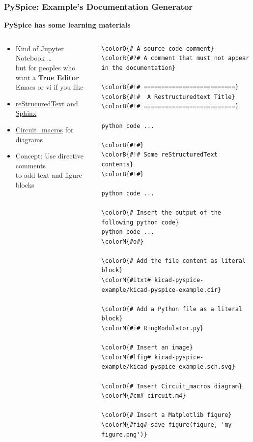 \begin{frame}[fragile]
  \frametitle{PySpice: Example's Documentation Generator}
  \centerline{\textbf{PySpice has some learning materials}}
  \begin{columns}[T]
    \begin{column}{.6\textwidth}
      \begin{itemize}
      \item Kind of Jupyter Notebook \ldots \\
        but for peoples who want a \textbf{True Editor} \\
        {\small Emacs} {\tiny or vi if you like}
      \item \href{http://docutils.sourceforge.net/rst.html}{reStrucuredText} and \href{http://www.sphinx-doc.org}{Sphinx}
      \item \href{https://ece.uwaterloo.ca/~aplevich/Circuit_macros/}{Circuit\_macros} for diagrams %
      \item Concept: Use directive comments \\
        to add text and figure blocks
      \end{itemize}
    \end{column}
    \begin{column}{.4\textwidth}
      \fontsize{4.5pt}{4.5pt}\selectfont
\begin{Verbatim}[commandchars=\\\{\}]
\colorO{# A source code comment}
\colorR{#?# A comment that must not appear in the documentation}

\colorB{#!# ==========================}
\colorB{#!#  A Restructuredtext Title}
\colorB{#!# ==========================}

python code ...

\colorB{#!#}
\colorB{#!# Some reStructuredText contents}
\colorB{#!#}

python code ...

\colorO{# Insert the output of the following python code}
python code ...
\colorM{#o#}

\colorO{# Add the file content as literal block}
\colorM{#itxt# kicad-pyspice-example/kicad-pyspice-example.cir}

\colorO{# Add a Python file as a literal block}
\colorM{#i# RingModulator.py}

\colorO{# Insert an image}
\colorM{#lfig# kicad-pyspice-example/kicad-pyspice-example.sch.svg}

\colorO{# Insert Circuit_macros diagram}
\colorM{#cm# circuit.m4}

\colorO{# Insert a Matplotlib figure}
\colorM{#fig# save_figure(figure, 'my-figure.png')}
\end{Verbatim}
      \normalsize
    \end{column}
  \end{columns}
\end{frame}

